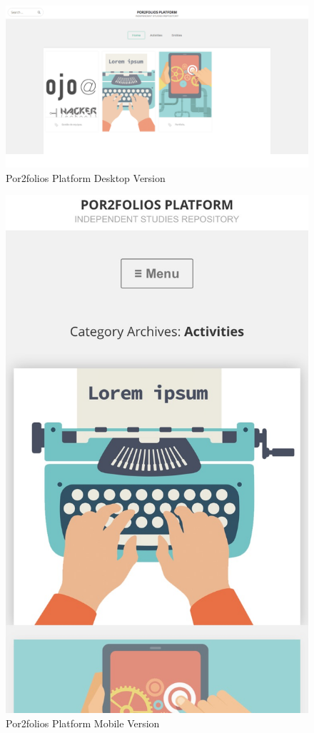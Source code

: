 \documentclass[a4paper,12pt,journal,twoside,compsoc]{PPIEEEtran}
\begin{document}
\begin{figure}[htb]
\centering
\includegraphics[width=1\linewidth]{desktop.png}
\caption{Por2folios Platform Desktop Version}
\label{fig_browser}
\end{figure}



\begin{figure}[htb]
\centering
\includegraphics[width=1\linewidth]{mobile}
\caption{Por2folios Platform Mobile Version}
\label{fig_mobile}
\end{figure}
\end{document}
